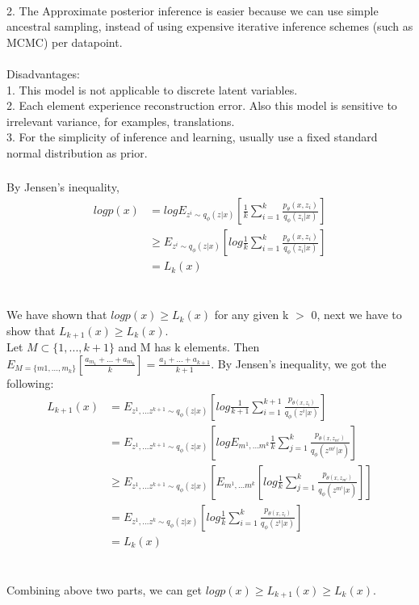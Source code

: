 \documentclass{article}
\begin{document}
\\
2. The Approximate posterior inference is easier because we can use simple ancestral sampling, instead of using expensive iterative inference schemes (such as MCMC) per datapoint.
\\
\\
Disadvantages: \\
1. This model is not applicable to discrete latent variables. 
\\
2. Each element experience reconstruction error. Also this model is sensitive to irrelevant variance, for examples, translations.
\\
3. For the simplicity of inference and learning, usually use a fixed standard normal distribution as prior. 

\subsubsection{}
By Jensen's inequality, \\
\begin{align*}
	log p(x) &= log E_{z^i \sim q_{\phi}(z|x)}[\frac{1}{k}\sum_{i=1}^k\frac{p_{\theta}(x, z_i)}{q_{\phi}(z_i|x)}] \\
	&\ge E_{z^i \sim q_{\phi}(z|x)}[log \frac{1}{k}\sum_{i=1}^k\frac{p_{\theta}(x, z_i)}{q_{\phi}(z_i|x)}] \\
	&= L_k(x)
\end{align*}
\\
\\
We have shown that $log p(x) \ge L_k(x)$ for any given k $>$ 0, next we have to show that $L_{k+1}(x) \ge L_k(x)$. \\
Let $M \subset \{1,...,k+1\}$ and M has k elements. Then 
$E_{M=\{m1,...,m_k\}}[\frac{a_{m_1}+...+a_{m_k}}{k}] = \frac{a_1+...+a_{k+1}}{k+1}$. By Jensen's inequality, we got the following: \\
\begin{align*}
	L_{k+1}(x) &= E_{z^1,...z^{k+1}\sim q_{\phi}(z|x)}[log \frac{1}{k+1}\sum_{i=1}^{k+1}\frac{p_{\theta(x,z_i)}}{q_{\phi}(z^i|x)}] \\
	&= E_{z^1,...z^{k+1}\sim q_{\phi}(z|x)}[log E_{m^1,...m^k} \frac{1}{k}\sum_{j=1}^{k}\frac{p_{\theta(x,z_{m^i})}}{q_{\phi}(z^{m^i}|x)}] \\
	&\ge E_{z^1,...z^{k+1}\sim q_{\phi}(z|x)} [E_{m^1,...m^k} [log \frac{1}{k}\sum_{j=1}^{k}\frac{p_{\theta(x,z_{m^i})}}{q_{\phi}(z^{m^i}|x)}]] \\
	&= E_{z^1,...z^{k}\sim q_{\phi}(z|x)}[log \frac{1}{k}\sum_{i=1}^{k}\frac{p_{\theta(x,z_i)}}{q_{\phi}(z^i|x)}] \\
	&= L_k(x)
\end{align*}
\\
\\
Combining above two parts, we can get $log p(x) \ge L_{k+1}(x) \ge L_k(x)$.
\end{document}
